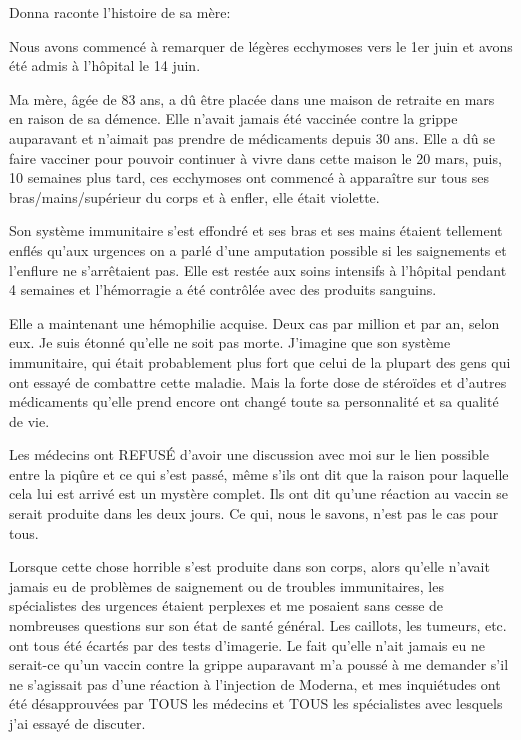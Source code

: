 Donna raconte l'histoire de sa mère:

Nous avons commencé à remarquer de légères ecchymoses vers le 1er juin et avons
été admis à l'hôpital le 14 juin.

Ma mère, âgée de 83 ans, a dû être placée dans une maison de retraite en mars en
raison de sa démence. Elle n'avait jamais été vaccinée contre la grippe
auparavant et n'aimait pas prendre de médicaments depuis 30 ans. Elle a dû se
faire vacciner pour pouvoir continuer à vivre dans cette maison le 20 mars,
puis, 10 semaines plus tard, ces ecchymoses ont commencé à apparaître sur tous
ses bras/mains/supérieur du corps et à enfler, elle était violette.

Son système immunitaire s'est effondré et ses bras et ses mains étaient
tellement enflés qu'aux urgences on a parlé d'une amputation possible si les
saignements et l'enflure ne s'arrêtaient pas. Elle est restée aux soins
intensifs à l'hôpital pendant 4 semaines et l'hémorragie a été contrôlée avec
des produits sanguins.

Elle a maintenant une hémophilie acquise. Deux cas par million et par an, selon
eux. Je suis étonné qu'elle ne soit pas morte. J'imagine que son système
immunitaire, qui était probablement plus fort que celui de la plupart des gens
qui ont essayé de combattre cette maladie. Mais la forte dose de stéroïdes et
d'autres médicaments qu'elle prend encore ont changé toute sa personnalité et sa
qualité de vie.

Les médecins ont REFUSÉ d'avoir une discussion avec moi sur le lien possible
entre la piqûre et ce qui s'est passé, même s'ils ont dit que la raison pour
laquelle cela lui est arrivé est un mystère complet. Ils ont dit qu'une réaction
au vaccin se serait produite dans les deux jours. Ce qui, nous le savons, n'est
pas le cas pour tous.

Lorsque cette chose horrible s'est produite dans son corps, alors qu'elle
n'avait jamais eu de problèmes de saignement ou de troubles immunitaires, les
spécialistes des urgences étaient perplexes et me posaient sans cesse de
nombreuses questions sur son état de santé général. Les caillots, les tumeurs,
etc. ont tous été écartés par des tests d'imagerie. Le fait qu'elle n'ait jamais
eu ne serait-ce qu'un vaccin contre la grippe auparavant m'a poussé à me
demander s'il ne s'agissait pas d'une réaction à l'injection de Moderna, et mes
inquiétudes ont été désapprouvées par TOUS les médecins et TOUS les spécialistes
avec lesquels j'ai essayé de discuter.

